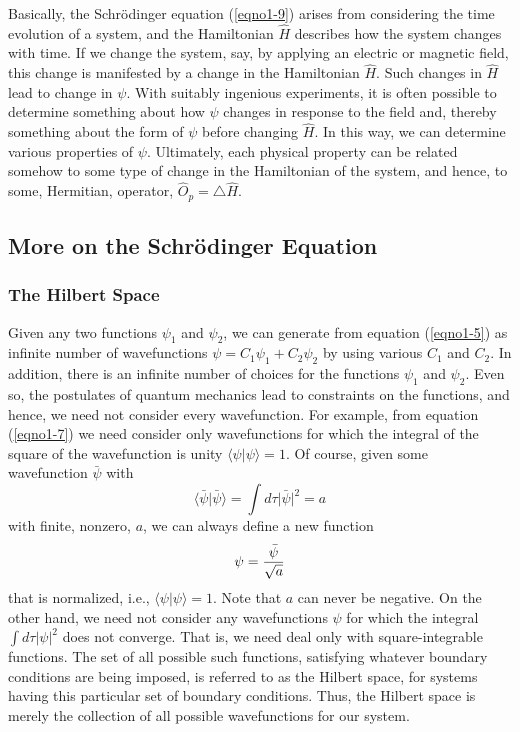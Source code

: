 Basically, the Schr\"odinger equation (\ref{eqno1-9}) arises from
considering the time evolution of a system, and the Hamiltonian ${\hat
H}$ describes how the system changes with time. If we change the
system, say, by applying an electric or magnetic field, this change is
manifested by a change in the Hamiltonian ${\hat H}$. Such changes in
${\hat H}$ lead to change in $\psi$.  With suitably ingenious
experiments, it is often possible to determine something about how
$\psi$ changes in response to the field and, thereby something about
the form of $\psi$ before changing ${\hat H}$. In this way, we can
determine various properties of $\psi$.  Ultimately, each physical
property can be related somehow to some type of change in the
Hamiltonian of the system, and hence, to some, Hermitian, operator,
${\hat O}_p = \triangle {\hat H}$.

\subsection{More on the Schr\"odinger Equation}

\subsubsection{The Hilbert Space}

Given any two functions $\psi_1$ and $\psi_2$, we can generate from
equation (\ref{eqno1-5}) as infinite number of wavefunctions $\psi =
C_1 \psi_1 + C_2 \psi_2$ by using various $C_1$ and $C_2$.  In
addition, there is an infinite number of choices for the functions
$\psi_1$ and $\psi_2$.  Even so, the postulates of quantum mechanics
lead to constraints on the functions, and hence, we need not consider
every wavefunction.  For example, from equation (\ref{eqno1-7}) we
need consider only wavefunctions for which the integral of the square
of the wavefunction is unity $\langle \psi | \psi \rangle = 1$. Of
course, given some wavefunction ${\bar{\psi}}$ with
\begin{equation}
\langle {\bar \psi} \vert {\bar \psi} \rangle
   = \int d \tau \vert {\bar \psi} \vert^2 = a
\end{equation}
with finite, nonzero, $a$, we can always define a new function
\begin{equation}
\psi = {{\bar \psi} \over \sqrt{a}}
\end{equation}
that is normalized, i.e., $\langle \psi | \psi \rangle = 1$.  Note
that $a$ can never be negative. On the other hand, we need not
consider any wavefunctions $\psi$ for which the integral $\int d \tau
| \psi |^2$ does not converge. That is, we need deal only with
square-integrable functions. The set of all possible such functions,
satisfying whatever boundary conditions are being imposed, is referred
to as the Hilbert space, for systems having this particular set of
boundary conditions. Thus, the Hilbert space is merely the collection
of all possible wavefunctions for our system.

